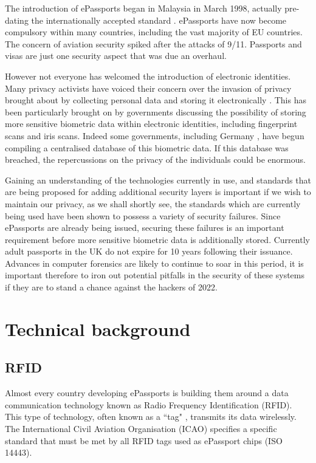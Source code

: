 \documentclass[12pt]{article}
\begin{document}
The introduction of ePassports began in Malaysia in March 1998, actually pre-dating the internationally accepted standard \cite{Avoine:2008wf}. ePassports have now become compulsory within many countries, including the vast majority of EU countries. The concern of aviation security spiked after the attacks of 9/11. Passports and visas are just one security aspect that was due an overhaul.

However not everyone has welcomed the introduction of electronic identities. Many privacy activists have voiced their concern over the invasion of privacy brought about by collecting personal data and storing it electronically \cite{Blundo:2008vs}. This has been particularly brought on by governments discussing the possibility of storing more sensitive biometric data within electronic identities, including fingerprint scans and iris scans. Indeed some governments, including Germany \cite{JRC:2008ws}, have begun compiling a centralised database of this biometric data. If this database was breached, the repercussions on the privacy of the individuals could be enormous. 

Gaining an understanding of the technologies currently in use, and standards that are being proposed for adding additional security layers is important if we wish to maintain our privacy, as we shall shortly see, the standards which are currently being used have been shown to possess a variety of security failures. Since ePassports are already being issued, securing these failures is an important requirement before more sensitive biometric data is additionally stored. Currently adult passports in the UK do not expire for 10 years following their issuance. Advances in computer forensics are likely to continue to soar in this period, it is important therefore to iron out potential pitfalls in the security of these systems if they are to stand a chance against the hackers of 2022. 

\section{Technical background}

\subsection{RFID}
\label{sec:RFID}
Almost every country developing ePassports is building them around a data communication technology known as Radio Frequency Identification (RFID). This type of technology, often known as a ``tag" \cite{Juels:2005wf}, transmits its data wirelessly. The International Civil Aviation Organisation (ICAO) specifies a specific standard that must be met by all RFID tags used as ePassport chips (ISO 14443). 
\end{document}
